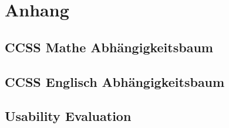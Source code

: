 \chapter*{Anhang}
\section{CCSS Mathe Abhängigkeitsbaum}
	\label{CCSSMath}
	\begin{center}
		
	\end{center}

\section{CCSS Englisch Abhängigkeitsbaum}
	\label{CCSSEnglish}
	\begin{center}
		
	\end{center}
	
\section{Usability Evaluation}
	\label{UEMarcel}
	\begin{center}
		
	\end{center}
